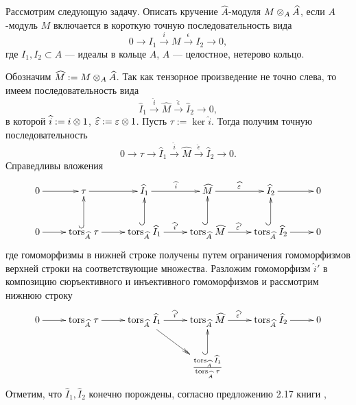     Рассмотрим следующую задачу. Описать кручение $\hat A$-модуля $M \otimes_A \widehat{A}$, если 
    $A$-модуль $M$ включается в короткую точную последовательность вида
    \begin{equation*}
        0 \rightarrow I_1 \xrightarrow{i} M \xrightarrow{\epsilon} I_2 \rightarrow 0,
    \end{equation*}
    где $I_1, I_2 \subset A$ --- идеалы в кольце $A$, $A$ --- целостное, нетерово кольцо. 

    Обозначим $\widehat{M} := M \otimes_A \widehat{A}$. Так как тензорное произведение не точно слева, то
    имеем последовательность вида
    \begin{equation*}
        \hat I_1 \xrightarrow{\hat i} \hat M \xrightarrow{\hat \epsilon} \hat I_2 \rightarrow 0,
    \end{equation*}
    в которой $\widehat i := i \otimes 1$, $\widehat {\varepsilon} := \varepsilon \otimes 1$. Пусть $\tau := \ker \hat i$. Тогда
    получим точную последовательность 
    \begin{equation*}
        0 \rightarrow \tau \rightarrow \hat I_1 \xrightarrow{\hat i} \hat M \xrightarrow{\hat \epsilon} \hat I_2 \rightarrow 0.
    \end{equation*}
    Справедливы вложения
    $$   
        \xymatrix{
            0 \ar[r] 
            &\tau \ar[r] 
            &\hat I_1 \ar[r]^{\hat i} 
            &\hat M \ar[r]^{\hat \epsilon} 
            &\hat I_2 \ar[r] 
            &0\\
            0 \ar[r] 
            & \Tors{\hat A}{\tau} \ar[r] \ar@{^{(}->}[u]
            & \Tors{\hat A}{\hat I_1} \ar[r]^{\hat i'} \ar@{^{(}->}[u]
            & \Tors{\hat A}{\hat M} \ar[r]^{\hat \epsilon'} \ar@{^{(}->}[u]
            & \Tors{\hat A}{\hat I_2} \ar[r] \ar@{^{(}->}[u]
            &0
        }
    $$
    где гомоморфизмы в нижней строке получены путем ограничения гомоморфизмов верхней строки на соответствующие множества. 
    Разложим гомоморфизм $\hat i'$ в композицию сюръективного и инъективного гомоморфизмов и рассмотрим нижнюю строку
    $$   
        \xymatrix{
            0 \ar[r] 
            & \Tors{\hat A}{\tau} \ar[r] 
            & \Tors{\hat A}{\hat I_1} \ar[r]^{\hat i'} \ar@{>>}[rd]
            & \Tors{\hat A}{\hat M} \ar[r]^{\hat \epsilon'} 
            & \Tors{\hat A}{\hat I_2} \ar[r] 
            &0
            \\
            &
            &
            &\frac{\Tors{\hat A}{\hat I_1}}{\Tors{\hat A}{\tau}} \ar@{^{(}->}[u] 
        }
    $$
    Отметим, что $\hat I_1, \hat I_2$ конечно порождены, согласно предложению 2.17 книги \cite{A-M}, 
